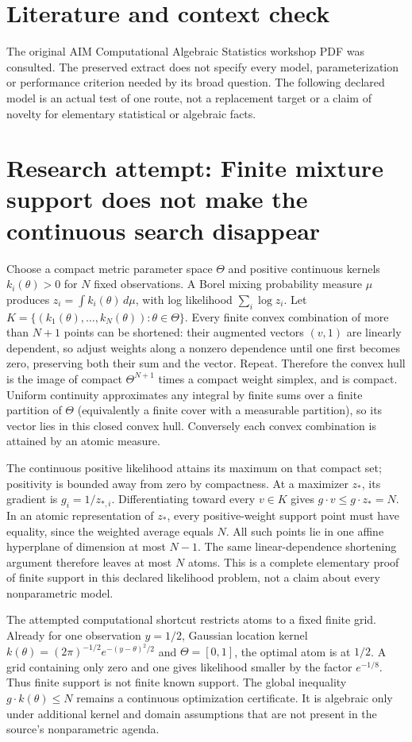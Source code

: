 \documentclass[11pt]{article}
\begin{document}
\section{Literature and context check}
The original AIM Computational Algebraic Statistics
 workshop PDF was consulted. The preserved extract does not specify every model,
 parameterization or performance criterion needed by its broad question. The
 following declared model is an actual test of one route, not a replacement
 target or a claim of novelty for elementary statistical or algebraic facts.
\section{Research attempt: Finite mixture support does not make the continuous search disappear}
Choose a compact metric parameter space $\Theta$ and positive continuous kernels
$k_i(\theta)>0$ for $N$ fixed observations. A Borel mixing probability measure $\mu$
produces $z_i=\int k_i(\theta)\,d\mu$, with log likelihood $\sum_i\log z_i$.
Let $K=\{(k_1(\theta),\ldots,k_N(\theta)):\theta\in\Theta\}$.
Every finite convex combination of more than $N+1$ points can be shortened:
their augmented vectors $(v,1)$ are linearly dependent, so adjust weights along
a nonzero dependence until one first becomes zero, preserving both their sum
and the vector. Repeat. Therefore the convex hull is the image of compact
$\Theta^{N+1}$ times a compact weight simplex, and is compact.
Uniform continuity approximates any integral by finite sums over a finite
partition of $\Theta$ (equivalently a finite cover with a measurable partition),
so its vector lies in this closed convex hull. Conversely each convex
combination is attained by an atomic measure.

The continuous positive likelihood attains its maximum on that compact set;
positivity is bounded away from zero by compactness. At a maximizer $z_*$,
its gradient is $g_i=1/z_{*,i}$. Differentiating toward every $v\in K$ gives
$g\cdot v\le g\cdot z_*=N$. In an atomic representation of $z_*$, every
positive-weight support point must have equality, since the weighted average
equals $N$. All such points lie in one affine hyperplane of dimension at most
$N-1$. The same linear-dependence shortening argument therefore leaves at
most $N$ atoms. This is a complete elementary proof of finite support in this
declared likelihood problem, not a claim about every nonparametric model.

The attempted computational shortcut restricts atoms to a fixed finite grid.
Already for one observation $y=1/2$, Gaussian location kernel
$k(\theta)=(2\pi)^{-1/2}e^{-(y-\theta)^2/2}$ and $\Theta=[0,1]$, the
optimal atom is at $1/2$. A grid containing only zero and one gives likelihood
smaller by the factor $e^{-1/8}$. Thus finite support is not finite known support.
The global inequality $g\cdot k(\theta)\le N$ remains a continuous
optimization certificate. It is algebraic only under additional kernel and
domain assumptions that are not present in the source's nonparametric agenda.
\end{document}
